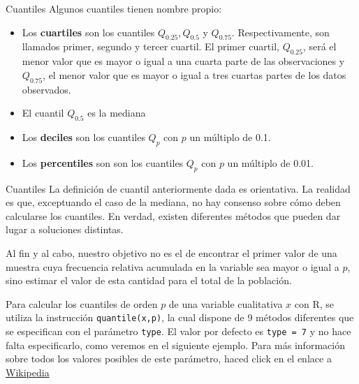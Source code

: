 \documentclass[
  ignorenonframetext,
  aspectratio=169]{beamer}
\providecommand{\tightlist}{%
  \setlength{\itemsep}{0pt}\setlength{\parskip}{0pt}}
\begin{document}
\begin{frame}{Cuantiles}
\protect\hypertarget{cuantiles}{}
Algunos cuantiles tienen nombre propio:

\begin{itemize}
\tightlist
\item
  Los \textbf{cuartiles} son los cuantiles \(Q_{0.25},Q_{0.5}\) y
  \(Q_{0.75}\). Respectivamente, son llamados primer, segundo y tercer
  cuartil. El primer cuartil, \(Q_{0.25}\), será el menor valor que es
  mayor o igual a una cuarta parte de las observaciones y \(Q_{0.75}\),
  el menor valor que es mayor o igual a tres cuartas partes de los datos
  observados.
\item
  El cuantil \(Q_{0.5}\) es la mediana
\item
  Los \textbf{deciles} son los cuantiles \(Q_p\) con \(p\) un múltiplo
  de 0.1.
\item
  Los \textbf{percentiles} son son los cuantiles \(Q_p\) con \(p\) un
  múltiplo de 0.01.
\end{itemize}
\end{frame}

\begin{frame}[fragile]{Cuantiles}
\protect\hypertarget{cuantiles-1}{}
La definición de cuantil anteriormente dada es orientativa. La realidad
es que, exceptuando el caso de la mediana, no hay consenso sobre cómo
deben calcularse los cuantiles. En verdad, existen diferentes métodos
que pueden dar lugar a soluciones distintas.

Al fin y al cabo, nuestro objetivo no es el de encontrar el primer valor
de una muestra cuya frecuencia relativa acumulada en la variable sea
mayor o igual a \(p\), sino estimar el valor de esta cantidad para el
total de la población.

Para calcular los cuantiles de orden \(p\) de una variable cualitativa
\(x\) con R, se utiliza la instrucción \texttt{quantile(x,p)}, la cual
dispone de 9 métodos diferentes que se especifican con el parámetro
\texttt{type}. El valor por defecto es \texttt{type\ =\ 7} y no hace
falta especificarlo, como veremos en el siguiente ejemplo. Para más
información sobre todos los valores posibles de este parámetro, haced
click en el enlace a
\href{https://es.wikipedia.org/wiki/Cuantil}{Wikipedia}
\end{frame}
\end{document}

